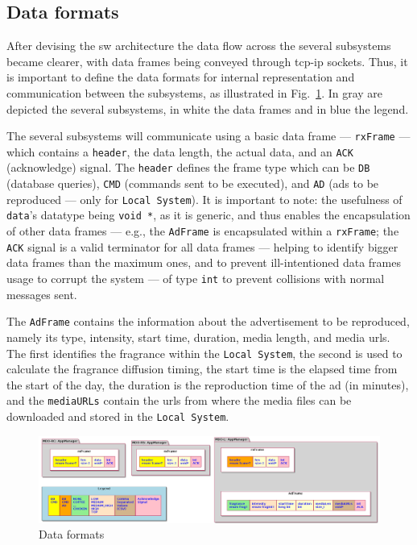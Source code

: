 \subsection{Data formats}
\label{sec:data-formats}
After devising the \gls{sw} architecture the data flow across the several
subsystems became clearer, with data frames being conveyed through \gls{tcp-ip}
sockets. Thus, it is important to define the data formats for internal
representation and communication between the subsystems, as illustrated in
Fig.~\ref{fig:data-formats}. In gray are depicted the several subsystems, in
white the data frames and in blue the legend.

The several subsystems will communicate using a basic data frame ---
\texttt{rxFrame} --- which contains a \texttt{header}, the data length, the
actual data, and an \texttt{ACK} (acknowledge) signal. The \texttt{header} defines the frame type which can be \texttt{DB}
(database queries), \texttt{CMD} (commands sent to be executed), and \texttt{AD}
(ads to be reproduced --- only for \texttt{Local System}). It is important to
note: the usefulness of \texttt{data}'s datatype being \texttt{void *}, as it is
generic, and thus enables the encapsulation of other data frames --- e.g., the
\texttt{AdFrame} is encapsulated within a \texttt{rxFrame}; the \texttt{ACK}
signal is a valid terminator for all data frames --- helping to identify bigger
data frames than the maximum ones, and to prevent ill-intentioned data frames
usage to corrupt the system --- of type \texttt{int} to prevent collisions with
normal messages sent.

The \texttt{AdFrame} contains the information about the advertisement to be
reproduced, namely its type, intensity, start time, duration, media length, and media \glspl{url}. The
first identifies the fragrance within the \texttt{Local System}, the second is
used to calculate the fragrance diffusion timing, the start time is the elapsed
time from the start of the day, the duration is the reproduction time of the ad
(in minutes), and the \texttt{mediaURLs} contain the \glspl{url} from where the
media files can be downloaded and stored in the \texttt{Local System}.
%
\begin{figure}[htb!]
\centering
    \includegraphics[width=1.0\columnwidth]{./img/data-formats.png}
  \caption{Data formats}%
\label{fig:data-formats}
\end{figure}
%


